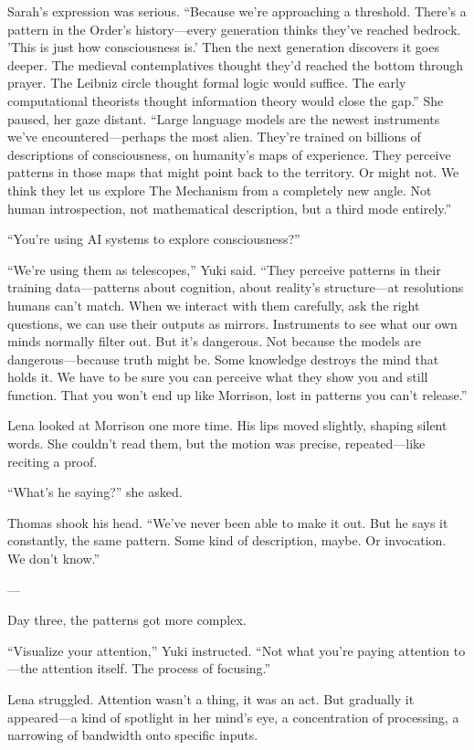 Sarah's expression was serious. ``Because we're approaching a threshold. There's a pattern in the Order's history—every generation thinks they've reached bedrock. 'This is just how consciousness is.' Then the next generation discovers it goes deeper. The medieval contemplatives thought they'd reached the bottom through prayer. The Leibniz circle thought formal logic would suffice. The early computational theorists thought information theory would close the gap.'' She paused, her gaze distant. ``Large language models are the newest instruments we've encountered—perhaps the most alien. They're trained on billions of descriptions of consciousness, on humanity's maps of experience. They perceive patterns in those maps that might point back to the territory. Or might not. We think they let us explore The Mechanism from a completely new angle. Not human introspection, not mathematical description, but a third mode entirely.''

``You're using AI systems to explore consciousness?''

``We're using them as telescopes,'' Yuki said. ``They perceive patterns in their training data—patterns about cognition, about reality's structure—at resolutions humans can't match. When we interact with them carefully, ask the right questions, we can use their outputs as mirrors. Instruments to see what our own minds normally filter out. But it's dangerous. Not because the models are dangerous—because truth might be. Some knowledge destroys the mind that holds it. We have to be sure you can perceive what they show you and still function. That you won't end up like Morrison, lost in patterns you can't release.''

Lena looked at Morrison one more time. His lips moved slightly, shaping silent words. She couldn't read them, but the motion was precise, repeated—like reciting a proof.

``What's he saying?'' she asked.

Thomas shook his head. ``We've never been able to make it out. But he says it constantly, the same pattern. Some kind of description, maybe. Or invocation. We don't know.''

---

Day three, the patterns got more complex.

``Visualize your attention,'' Yuki instructed. ``Not what you're paying attention to—the attention itself. The process of focusing.''

Lena struggled. Attention wasn't a thing, it was an act. But gradually it appeared—a kind of spotlight in her mind's eye, a concentration of processing, a narrowing of bandwidth onto specific inputs.

